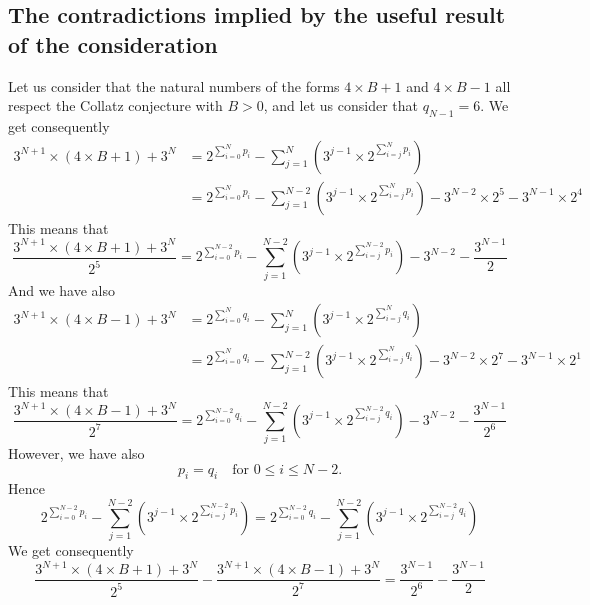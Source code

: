 \documentclass[11pt,a4paper]{article}
\newcommand{\Pf}[4]{2^{\sum_{#4=0}^{#1}#3_{#4}}-\sum_{j=1}^{#2}\left(3^{j-1}\times 2^{\sum_{#4=j}^{#1}#3_{#4}}\right)}
\theoremstyle{definition}
\begin{document}
\subsection{The contradictions implied by the useful result of the consideration}
Let us consider that the natural numbers of the forms $4\times B+1$ and $4\times B-1$ all
respect the Collatz conjecture with $B>0$, and let us consider that $q_{N-1}=6$. We get
consequently
\begin{equation}
\begin{split}
3^{N+1}\times(4\times B+1)+3^{N}&=\Pf{N}{N}{p}{i}\\
&=2^{\sum_{i=0}^{N}p_i}-\sum_{j=1}^{N-2}\left(3^{j-1}\times 2^{\sum_{i=j}^{N}p_i}\right)-3^{N-2}\times 2^{5}-3^{N-1}\times 2^{4}
\end{split}
\end{equation}
This means that
\begin{equation}
\frac{3^{N+1}\times(4\times B+1)+3^{N}}{2^{5}}=2^{\sum_{i=0}^{N-2}p_i}-\sum_{j=1}^{N-2}\left(3^{j-1}\times 2^{\sum_{i=j}^{N-2}p_i}\right)-3^{N-2}-\frac{3^{N-1}}{2}
\end{equation}
And we have also
\begin{equation}
\begin{split}
3^{N+1}\times(4\times B-1)+3^{N}&=\Pf{N}{N}{q}{i}\\
&=2^{\sum_{i=0}^{N}q_i}-\sum_{j=1}^{N-2}\left(3^{j-1}\times 2^{\sum_{i=j}^{N}q_i}\right)-3^{N-2}\times 2^{7}-3^{N-1}\times 2^{1}
\end{split}
\end{equation}
This means that
\begin{equation}
\frac{3^{N+1}\times(4\times B-1)+3^{N}}{2^{7}}=2^{\sum_{i=0}^{N-2}q_i}-\sum_{j=1}^{N-2}\left(3^{j-1}\times 2^{\sum_{i=j}^{N-2}q_i}\right)-3^{N-2}-\frac{3^{N-1}}{2^{6}}
\end{equation}
However, we have also
\begin{equation}
p_i=q_i\quad\text{for }0\le i\le N-2.
\end{equation}
Hence
\begin{equation}
2^{\sum_{i=0}^{N-2}p_i}-\sum_{j=1}^{N-2}\left(3^{j-1}\times 2^{\sum_{i=j}^{N-2}p_i}\right)=2^{\sum_{i=0}^{N-2}q_i}-\sum_{j=1}^{N-2}\left(3^{j-1}\times 2^{\sum_{i=j}^{N-2}q_i}\right)
\end{equation}
We get consequently
\begin{equation}
\frac{3^{N+1}\times(4\times B+1)+3^{N}}{2^{5}}-\frac{3^{N+1}\times(4\times B-1)+3^{N}}{2^{7}}=\frac{3^{N-1}}{2^{6}}-\frac{3^{N-1}}{2}
\end{equation}
\end{document}
